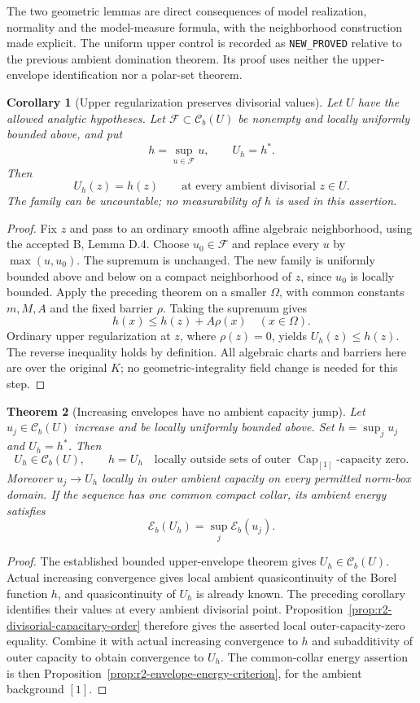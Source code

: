 \documentclass[11pt,a4paper]{article}
\numberwithin{equation}{section}
\newtheorem{theorem}{Theorem}[section]
\newtheorem{corollary}[theorem]{Corollary}
\theoremstyle{definition}
\theoremstyle{remark}
\newcommand{\Cb}{\mathcal C_b}
\begin{document}
The two geometric lemmas are direct consequences of model
realization, normality and the model-measure formula, with
the neighborhood construction made explicit. The uniform upper
control is recorded as \texttt{NEW\_PROVED} relative to the
previous ambient domination theorem. Its proof uses neither
the upper-envelope identification nor a polar-set theorem.

\begin{corollary}[Upper regularization preserves divisorial values]
\label{cor:r2-divisorial-no-jump}
Let $U$ have the allowed analytic hypotheses. Let
$\mathcal F\subset\Cb(U)$ be nonempty and locally uniformly
bounded above, and put
\[
 h=\sup_{u\in\mathcal F}u,\qquad U_h=h^*.
\]
Then
\[
 U_h(z)=h(z)\qquad\text{at every ambient divisorial }z\in U.
\]
The family can be uncountable; no measurability of $h$ is used
in this assertion.
\end{corollary}

\begin{proof}
Fix $z$ and pass to an ordinary smooth affine algebraic
neighborhood, using the accepted B, Lemma D.4. Choose
$u_0\in\mathcal F$ and replace every $u$ by $\max(u,u_0)$.
The supremum is unchanged. The new family is uniformly bounded
above and below on a compact neighborhood of $z$, since
$u_0$ is locally bounded. Apply the preceding theorem on a
smaller $\Omega$, with common constants $m,M,A$ and the
fixed barrier $\rho$. Taking the supremum gives
\[
 h(x)\leq h(z)+A\rho(x)\quad(x\in\Omega).
\]
Ordinary upper regularization at $z$, where $\rho(z)=0$,
yields $U_h(z)\leq h(z)$. The reverse inequality holds by
definition. All algebraic charts and barriers here are over
the original $K$; no geometric-integrality field change is
needed for this step.
\end{proof}

\begin{theorem}[Increasing envelopes have no ambient capacity jump]
\label{thm:r2-increasing-no-jump}
Let $u_j\in\Cb(U)$ increase and be locally uniformly bounded
above. Set $h=\sup_j u_j$ and $U_h=h^*$. Then
\[
 U_h\in\Cb(U),\qquad
 h=U_h\quad\text{locally outside sets of outer }
           \operatorname{Cap}_{[1]}\text{-capacity zero}.
\]
Moreover $u_j\to U_h$ locally in outer ambient capacity on
every permitted norm-box domain. If the sequence has one
common compact collar, its ambient energy satisfies
\[
 \mathcal E_b(U_h)=\sup_j\mathcal E_b(u_j).
\]
\end{theorem}

\begin{proof}
The established bounded upper-envelope theorem gives
$U_h\in\Cb(U)$. Actual increasing convergence gives local
ambient quasicontinuity of the Borel function $h$, and
quasicontinuity of $U_h$ is already known. The preceding
corollary identifies their values at every ambient divisorial
point. Proposition~\ref{prop:r2-divisorial-capacitary-order}
therefore gives the asserted local outer-capacity-zero equality.
Combine it with actual increasing convergence to $h$ and
subadditivity of outer capacity to obtain convergence to $U_h$.
The common-collar energy assertion is then
Proposition~\ref{prop:r2-envelope-energy-criterion}, for the
ambient background $[1]$.
\end{proof}
\end{document}
